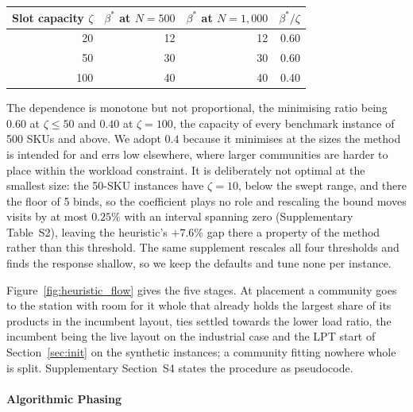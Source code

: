 \documentclass[]{interact}
\begin{document}
\begin{table}[H]
\centering
{}
{\small\begin{tabular*}{\textwidth}{@{\extracolsep{\fill}}rrrr@{}}
\toprule
Slot capacity $\zeta$ & $\beta^\ast$ at $N=500$ & $\beta^\ast$ at $N=1{,}000$ & $\beta^\ast/\zeta$ \\
\midrule
20  & 12 & 12 & 0.60 \\
50  & 30 & 30 & 0.60 \\
100 & 40 & 40 & 0.40 \\
\bottomrule
\end{tabular*}}
\label{tab:capsweep}
\end{table}

The dependence is monotone but not proportional, the minimising ratio being $0.60$ at $\zeta\le 50$ and $0.40$ at $\zeta=100$, the capacity of every benchmark instance of 500 SKUs and above. We adopt $0.4$ because it minimises at the sizes the method is intended for and errs low elsewhere, where larger communities are harder to place within the workload constraint. It is deliberately not optimal at the smallest size: the 50-SKU instances have $\zeta=10$, below the swept range, and there the floor of 5 binds, so the coefficient plays no role and rescaling the bound moves visits by at most $0.25\%$ with an interval spanning zero (Supplementary Table~S2), leaving the heuristic's $+7.6\%$ gap there a property of the method rather than this threshold. The same supplement rescales all four thresholds and finds the response shallow, so we keep the defaults and tune none per instance.

Figure~\ref{fig:heuristic_flow} gives the five stages. At placement a community goes to the station with room for it whole that already holds the largest share of its products in the incumbent layout, ties settled towards the lower load ratio, the incumbent being the live layout on the industrial case and the LPT start of Section~\ref{sec:init} on the synthetic instances; a community fitting nowhere whole is split. Supplementary Section~S4 states the procedure as pseudocode.

\paragraph{Algorithmic Phasing} \\
\end{document}
